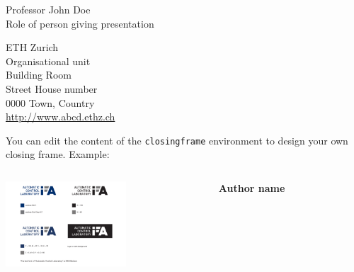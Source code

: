 \begin{closingframe}

Professor John Doe\\
Role of person giving presentation\\

\medskip

ETH Zurich\\
Organisational unit\\
Building Room\\
Street House number\\
0000 Town, Country\\
\url{http://www.abcd.ethz.ch}

\end{closingframe}


\begin{closingframe}

	You can edit the content of the \texttt{closingframe} environment to design your own closing frame. Example:
	
	\vspace{15mm}

	\begin{columns}
		\begin{column}{0.55\textwidth}
			\raggedleft
			\includegraphics[width=45mm]{elements/IFA_logo_ENG_colours_horizontal} 
		\end{column}
		\begin{column}{0.45\textwidth}
			\textbf{Author name}\\
		\end{column}
	\end{columns}

	\vspace{20mm}
			
\end{closingframe}
